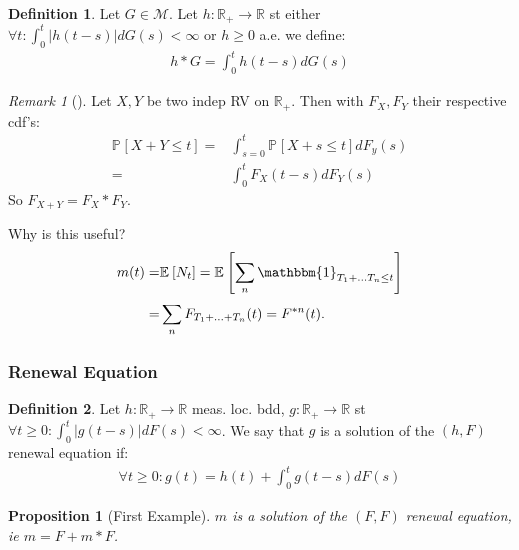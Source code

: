\documentclass[12pt]{book}
\newtheorem{prop}[theorem]{Proposition}
\theoremstyle{definition}
\newtheorem{defn}{Definition}[section]
\theoremstyle{remark}
\newtheorem{rmk}[theorem]{Remark}
\begin{document}
\begin{defn}
	Let $G \in \mathcal{M}$. Let $h: \mathbb{R}_+ \to \mathbb{R}$ st either $\forall t: \int_{0}^{t}| h(t-s) | dG(s) < \infty $ or $h\geq 0$ a.e. we define:
\begin{align}
	h*G = \int_{0}^{t} h(t-s)dG(s)
\end{align}

\end{defn}

\begin{rmk}[]
	Let $X,Y$ be two indep RV on $\mathbb{R}_+$. Then with  $F_X, F_Y$ their respective cdf's: 
\begin{align}
	\mathbb{P}_{} \left[ X+Y \leq t \right] =& \int_{s=0}^{t} \mathbb{P}_{} \left[  X+s \leq t \right] dF_y(s) \\
	=& \int_{0}^{t} F_X(t-s)dF_Y(s)
\end{align}
So $F_{X+Y} = F_X * F_Y$.
\end{rmk}

Why is this useful?
\begin{align}
	m(t) =& \mathbb{E}_{} \left[ N_t \right] = \mathbb{E}_{} \left[ \sum_{n}^{} \mathbbm{1}_{T_1+...T_n \leq t} \right] \\
	=& \sum_{n}^{} F_{T_1 +...+T_n} (t) = F^{*n}(t).
\end{align}

\subsubsection{Renewal Equation}
\begin{defn}
	Let $h:\mathbb{R}_+ \to \mathbb{R}$ meas. loc. bdd, $g:\mathbb{R}_+ \to \mathbb{R}$ st $ \forall t\geq 0: \int_{0}^{t} |g(t-s)|dF(s) <\infty$. We say that $g$ is a solution of the $(h,F)$ renewal equation if:
\begin{align}
	\forall t\geq 0: g(t) = h(t) + \int_{0}^{t} g(t-s)dF(s)
\end{align}
\end{defn}

\begin{prop}[First Example]
	$m$ is a solution of the $(F,F)$ renewal equation, ie $m=F+m*F$.	
\end{prop}
\end{document}
